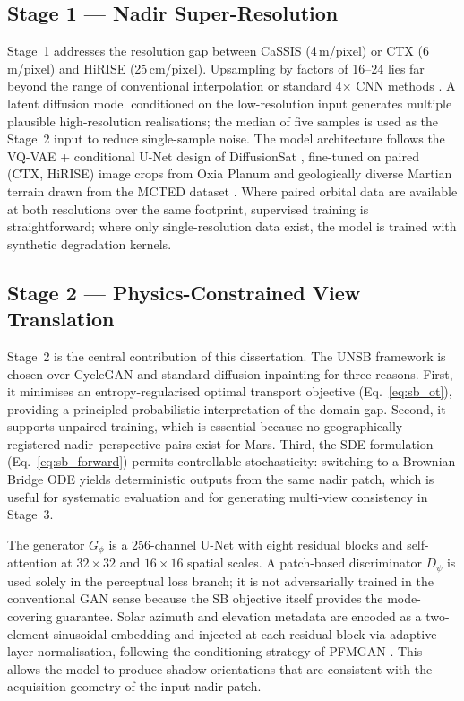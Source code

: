 \documentclass[10pt,journal]{IEEEtran}
\begin{document}
\subsection{Stage 1 --- Nadir Super-Resolution}
Stage~1 addresses the resolution gap between CaSSIS (4\,m/pixel) or CTX
(6\,m/pixel) and HiRISE (25\,cm/pixel). Upsampling by factors of 16--24 lies
far beyond the range of conventional interpolation or standard 4$\times$ CNN
methods \cite{wu2024rstsrn}. A latent diffusion model conditioned on the
low-resolution input \cite{khanna2024diffusionsat,zhu2025taming} generates
multiple plausible high-resolution realisations; the median of five samples is
used as the Stage~2 input to reduce single-sample noise. The model architecture
follows the VQ-VAE + conditional U-Net design of DiffusionSat
\cite{khanna2024diffusionsat}, fine-tuned on paired (CTX, HiRISE) image crops
from Oxia Planum and geologically diverse Martian terrain drawn from
the MCTED dataset \cite{osadnik2025mcted}. Where paired orbital data are
available at both resolutions over the same footprint, supervised training is
straightforward; where only single-resolution data exist, the model is trained
with synthetic degradation kernels.

\subsection{Stage 2 --- Physics-Constrained View Translation}
\label{sec:stage2}
Stage~2 is the central contribution of this dissertation. The UNSB framework
\cite{kim2024unsb} is chosen over CycleGAN and standard diffusion inpainting
\cite{catalano2025inpainting} for three reasons. First, it minimises an
entropy-regularised optimal transport objective (Eq.~\ref{eq:sb_ot}), providing
a principled probabilistic interpretation of the domain gap. Second, it supports
unpaired training, which is essential because no geographically registered
nadir--perspective pairs exist for Mars. Third, the SDE formulation
(Eq.~\ref{eq:sb_forward}) permits controllable stochasticity: switching to a
Brownian Bridge ODE \cite{xiao2025brownian} yields deterministic outputs from
the same nadir patch, which is useful for systematic evaluation and for
generating multi-view consistency in Stage~3.

The generator $G_\phi$ is a 256-channel U-Net with eight residual blocks and
self-attention at $32 \times 32$ and $16 \times 16$ spatial scales. A
patch-based discriminator $D_\psi$ is used solely in the perceptual loss branch;
it is not adversarially trained in the conventional GAN sense because the SB
objective itself provides the mode-covering guarantee. Solar azimuth and
elevation metadata are encoded as a two-element sinusoidal embedding and
injected at each residual block via adaptive layer normalisation, following the
conditioning strategy of PFMGAN \cite{zou2026pfmgan}. This allows the model to
produce shadow orientations that are consistent with the acquisition geometry of
the input nadir patch.
\end{document}
